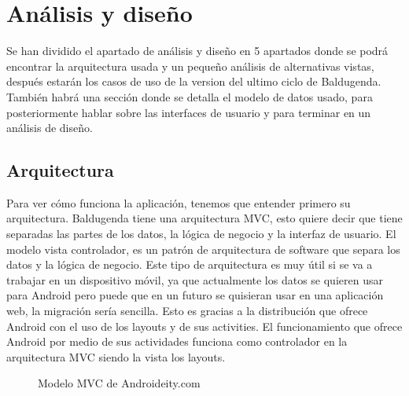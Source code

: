 \section{Análisis y diseño}
\label{secc:análisis y diseño}
Se han dividido el apartado de análisis y diseño en 5 apartados donde se podrá encontrar la arquitectura usada y un pequeño análisis de alternativas vistas, después estarán los casos de uso de la version del ultimo ciclo de Baldugenda. También habrá una sección donde se detalla el modelo de datos usado, para posteriormente hablar sobre las interfaces de usuario y para terminar en un análisis de diseño. 
\subsection{Arquitectura}
\label{subsecc:arquitectura}

Para ver cómo funciona la aplicación, tenemos que entender primero su arquitectura. Baldugenda tiene una arquitectura MVC, esto quiere decir que tiene separadas las partes de los datos, la lógica de negocio y la interfaz de usuario.
El modelo vista controlador, es un patrón de arquitectura de software que separa los datos y la lógica de negocio. Este tipo de arquitectura es muy útil si se va a trabajar en un dispositivo móvil, ya que actualmente los datos se quieren usar para Android pero puede que en un futuro se quisieran usar en una aplicación web, la migración sería sencilla. Esto es gracias a la distribución que ofrece Android con el uso de los layouts y de sus activities.
El funcionamiento que ofrece Android por medio de sus actividades funciona como controlador en la arquitectura MVC siendo la vista los layouts.

\begin{figure}[H] 
  \begin{center} 
    \caption{Modelo MVC de Androideity.com} 
    \label{fig:ModeloMVC} 
  \end{center} 
\end{figure}

